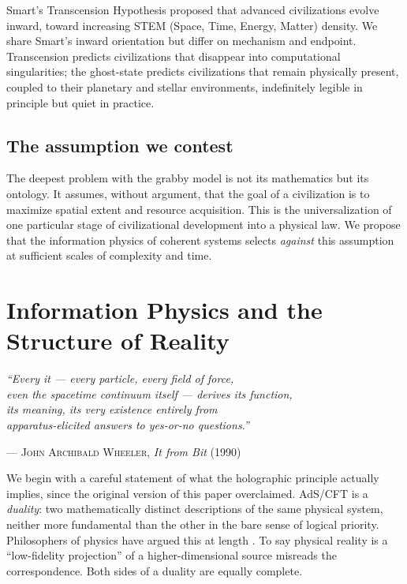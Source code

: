 \documentclass[12pt, a4paper]{article}
\begin{document}
Smart's Transcension Hypothesis \citep{smart2012} proposed that advanced civilizations
evolve inward, toward increasing STEM (Space, Time, Energy, Matter) density. We share
Smart's inward orientation but differ on mechanism and endpoint. Transcension predicts
civilizations that disappear into computational singularities; the ghost-state predicts
civilizations that remain physically present, coupled to their planetary and stellar
environments, indefinitely legible in principle but quiet in practice.

\subsection{The assumption we contest}

The deepest problem with the grabby model is not its mathematics but its ontology. It
assumes, without argument, that the goal of a civilization is to maximize spatial extent and
resource acquisition. This is the universalization of one particular stage of civilizational
development into a physical law. We propose that the information physics of coherent systems
selects \textit{against} this assumption at sufficient scales of complexity and time.

\section{Information Physics and the Structure of Reality}

\epigraph{
  \textit{``Every it --- every particle, every field of force,\\
  even the spacetime continuum itself --- derives its function,\\
  its meaning, its very existence entirely from\\
  apparatus-elicited answers to yes-or-no questions.''}
}{--- \textsc{John Archibald Wheeler,} \textit{It from Bit} (1990)}

We begin with a careful statement of what the holographic principle actually implies, since
the original version of this paper overclaimed. AdS/CFT is a \textit{duality}: two
mathematically distinct descriptions of the same physical system, neither more fundamental
than the other in the bare sense of logical priority. Philosophers of physics have argued
this at length \citep{deharo2017, lehbihan2018, teh2013}. To say physical reality is a
``low-fidelity projection'' of a higher-dimensional source misreads the correspondence. Both
sides of a duality are equally complete.
\end{document}
